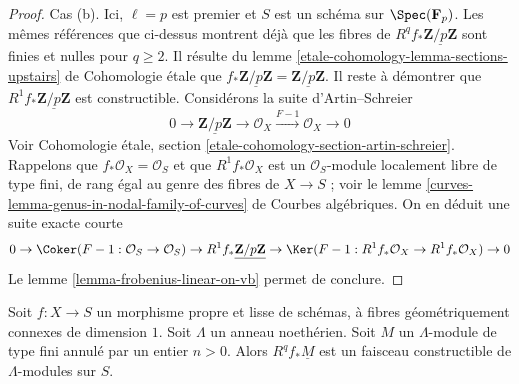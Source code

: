 \begin{proof}
\medskip\noindent
Cas (b). Ici, $\ell = p$ est premier et $S$ est un schéma sur
$\Spec(\mathbf{F}_p)$. Les mêmes références que ci-dessus montrent déjà
que les fibres de $R^qf_*\underline{\mathbf{Z}/p\mathbf{Z}}$
sont finies et nulles pour $q \geq 2$. Il résulte du
lemme \ref{etale-cohomology-lemma-sections-upstairs} de Cohomologie étale
que $f_*\underline{\mathbf{Z}/p\mathbf{Z}} =
\underline{\mathbf{Z}/p\mathbf{Z}}$. Il reste à démontrer
que $R^1f_*\underline{\mathbf{Z}/p\mathbf{Z}}$ est constructible.
Considérons la suite d'Artin--Schreier
$$
0 \to \underline{\mathbf{Z}/p\mathbf{Z}} \to \mathcal{O}_X
\xrightarrow{F - 1} \mathcal{O}_X
\to 0
$$
Voir Cohomologie étale, section \ref{etale-cohomology-section-artin-schreier}.
Rappelons que $f_*\mathcal{O}_X = \mathcal{O}_S$ et que
$R^1f_*\mathcal{O}_X$ est un $\mathcal{O}_S$-module localement libre de type fini,
de rang égal au genre des fibres de $X \to S$ ; voir le
lemme \ref{curves-lemma-genus-in-nodal-family-of-curves} de Courbes algébriques.
On en déduit une suite exacte courte
$$
0 \to
\Coker(F - 1 : \mathcal{O}_S \to \mathcal{O}_S)
\to R^1f_*\underline{\mathbf{Z}/p\mathbf{Z}} \to
\Ker(F - 1 : R^1f_*\mathcal{O}_X \to R^1f_*\mathcal{O}_X)
\to 0
$$
Le lemme \ref{lemma-frobenius-linear-on-vb} permet de conclure.
\end{proof}

\begin{lemma}
\label{lemma-proper-smooth-family-curves-modules}
Soit $f : X \to S$ un morphisme propre et lisse de schémas, à
fibres géométriquement connexes de dimension $1$. Soit $\Lambda$
un anneau noethérien. Soit $M$ un $\Lambda$-module de type fini
annulé par un entier $n > 0$. Alors $R^qf_*\underline{M}$
est un faisceau constructible de $\Lambda$-modules sur $S$.
\end{lemma}

